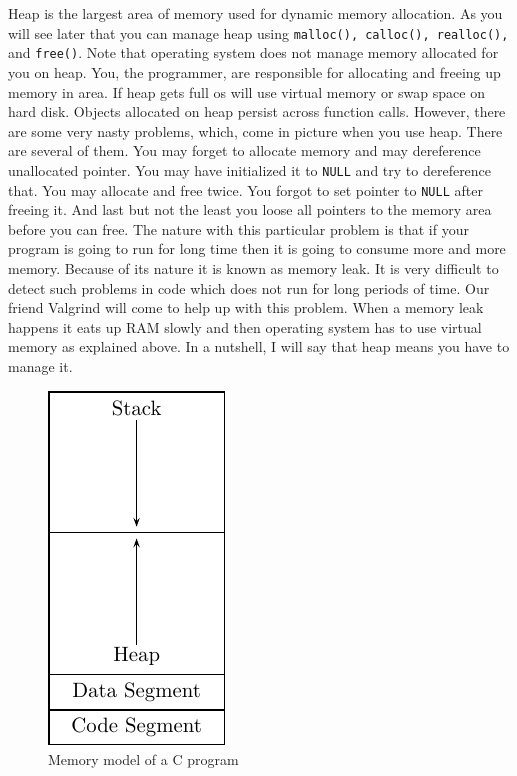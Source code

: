 Heap is the largest area of memory used for dynamic memory allocation. As
you will see later that you can manage heap using \texttt{malloc(), calloc(),
realloc(),} and \texttt{free()}. Note that operating system does not manage memory
allocated for you on heap. You, the programmer, are responsible for allocating and
freeing up memory in area. If heap gets full os will use virtual memory or swap
space on hard disk. Objects allocated on heap persist across function
calls. However, there are some very nasty problems, which, come in picture when
you use heap. There are several of them. You may forget to allocate memory and
may dereference unallocated pointer. You may have initialized it to
\texttt{NULL} and try to dereference that. You may allocate and free twice. You
forgot to set pointer to \texttt{NULL} after freeing it. And last but not the
least you loose all pointers to the memory area before you can free. The nature
with this particular problem is that if your program is going to run for long
time then it is going to consume more and more memory. Because of its nature it
is known as memory leak. It is very difficult to detect such problems in code
which does not run for long periods of time. Our friend Valgrind will come to
help up with this problem. When a memory leak happens it eats up RAM slowly and
then operating system has to use virtual memory as explained above. In a
nutshell, I will say that heap means you have to manage it.

\begin{figure}[t!]
\begin{center}
\includegraphics{figs/mem_model.pdf}
\end{center}
\caption{Memory model of a C program}
\end{figure}

